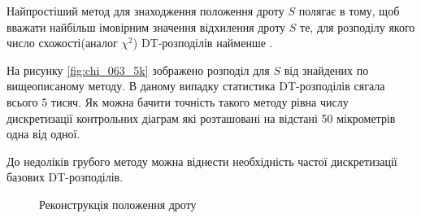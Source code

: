 	Найпростіший метод для знаходження положення дроту $S$ полягає в тому, щоб вважати найбільш імовірним значення відхилення дроту  $S$ те, для розподілу якого  число схожості(аналог $\chi^2$) DT-розподілів найменше .

	На рисунку 	\ref{fig:chi_063_5k} зображено розподіл для $S$ від знайдених по вищеописаному методу. В даному випадку статистика DT-розподілів сягала всього 5 тисяч. Як можна бачити точність такого методу рівна числу дискретизації контрольних діаграм які розташовані на відстані 50 мікрометрів одна від одної.
	
	До недоліків грубого методу можна віднести необхідність частої дискретизації базових DT-розподілів.
	\begin{figure}[h!]
		\centering
		\qquad
		\caption{Реконструкція положення дроту}			
	\end{figure}	
	
	
